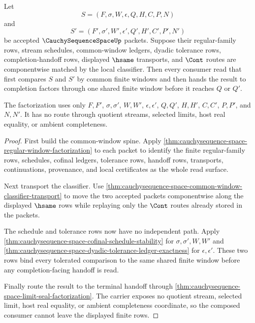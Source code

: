 \begin{theorem}
\label{thm:cauchysequence-space-two-stage-window-composition}
Let
$$
S=(F,\sigma,W,\epsilon,Q,H,C,P,N)
$$
and
$$
S'=(F',\sigma',W',\epsilon',Q',H',C',P',N')
$$
be accepted $\CauchySequenceSpaceUp$ packets. Suppose their regular-family rows, stream schedules, common-window ledgers, dyadic tolerance rows, completion-handoff rows, displayed $\hsame$ transports, and $\Cont$ routes are componentwise matched by the local classifier. Then every consumer read that first compares $S$ and $S'$ by common finite windows and then hands the result to completion factors through one shared finite window before it reaches $Q$ or $Q'$.

The factorization uses only $F,F'$, $\sigma,\sigma'$, $W,W'$, $\epsilon,\epsilon'$, $Q,Q'$, $H,H'$, $C,C'$, $P,P'$, and $N,N'$. It has no route through quotient streams, selected limits, host real equality, or ambient completeness.
\end{theorem}
\begin{proof}
First build the common-window spine. Apply \autoref{thm:cauchysequence-space-regular-window-factorization} to each packet to identify the finite regular-family rows, schedules, cofinal ledgers, tolerance rows, handoff rows, transports, continuations, provenance, and local certificates as the whole read surface.

Next transport the classifier. Use \autoref{thm:cauchysequence-space-common-window-classifier-transport} to move the two accepted packets componentwise along the displayed $\hsame$ rows while replaying only the $\Cont$ routes already stored in the packets.

The schedule and tolerance rows now have no independent path. Apply \autoref{thm:cauchysequence-space-cofinal-schedule-stability} for $\sigma,\sigma',W,W'$ and \autoref{thm:cauchysequence-space-dyadic-tolerance-ledger-exactness} for $\epsilon,\epsilon'$. These two rows bind every tolerated comparison to the same shared finite window before any completion-facing handoff is read.

Finally route the result to the terminal handoff through \autoref{thm:cauchysequence-space-limit-seal-factorization}. The carrier exposes no quotient stream, selected limit, host real equality, or ambient completeness coordinate, so the composed consumer cannot leave the displayed finite rows.
\end{proof}


